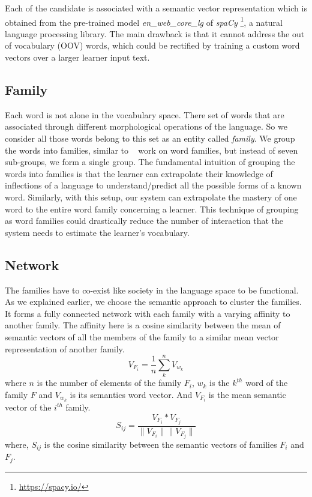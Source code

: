 \documentclass[11pt,a4paper]{article}
\begin{document}
Each of the candidate is associated with a semantic vector representation which is obtained from the pre-trained model \emph{en\_web\_core\_lg} of \emph{spaCy} \footnote{\url{https://spacy.io/}}, a natural language processing library. The main drawback is that it cannot address the out of vocabulary (OOV) words, which could be rectified by training a custom word vectors over a larger learner input text.

\subsection{Family}
Each word is not alone in the vocabulary space. There set of words that are associated through different morphological operations of the language. So we consider all those words belong to this set as an entity called \textit{family}.
We group the words into families, similar to ~\cite{bauer1993word} work on word families, but instead of seven sub-groups, we form a single group. The fundamental intuition of grouping the words into families is that the learner can extrapolate their knowledge of inflections of a language to understand/predict all the possible forms of a known word. Similarly, with this setup, our system can extrapolate the mastery of one word to the entire word family concerning a learner. This technique of grouping as word families could drastically reduce the number of interaction that the system needs to estimate the learner's vocabulary.

\subsection{Network}
The families have to co-exist like society in the language space to be functional. As we explained earlier, we choose the semantic approach to cluster the families. It forms a fully connected network with each family with a varying affinity to another family. The affinity here is a cosine similarity between the mean of semantic vectors of all the members of the family to a similar mean vector representation of another family.
\begin{equation}
  V_{F_i} = \frac{1}{n} \sum_{k}^{n} V_{w_k}
\end{equation}
where ${n}$ is the number of elements of the family ${F_i}$, ${w_k}$ is the ${k^{th}}$ word of the family ${F}$ and ${V_{w_{k}}}$ is its semantics word vector. And ${V_{F_{i}}}$ is the mean semantic vector of the ${i^{th}}$ family.
\begin{equation}
  S_{ij} = \frac{V_{F_i} * V_{F_j}}{\|V_{F_i}\|  \|V_{F_j}\|}
\end{equation}
where, ${S_{ij}}$ is the cosine similarity between the semantic vectors of families ${F_i}$ and ${F_j}$.
\end{document}
